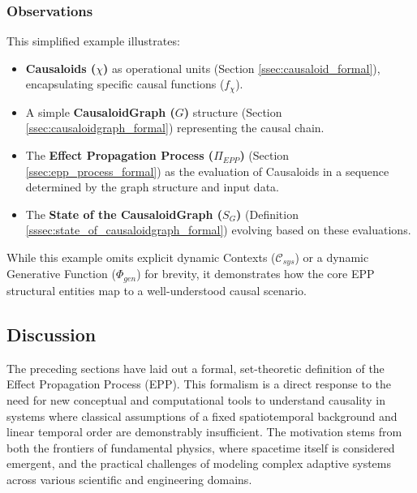     \subsubsection{Observations}
    \label{ssec:example_observations_connection}
    This simplified example illustrates:
    \begin{itemize}
        \item \textbf{Causaloids (\(\chi\))} as operational units (Section \ref{ssec:causaloid_formal}), encapsulating specific causal functions (\(f_\chi\)).
        \item A simple \textbf{CausaloidGraph (\(G\))} structure (Section \ref{ssec:causaloidgraph_formal}) representing the causal chain.
        \item The \textbf{Effect Propagation Process (\(\Pi_{EPP}\))} (Section \ref{ssec:epp_process_formal}) as the evaluation of Causaloids in a sequence determined by the graph structure and input data.
        \item The \textbf{State of the CausaloidGraph (\(S_G\))} (Definition \ref{sssec:state_of_causaloidgraph_formal}) evolving based on these evaluations.
    \end{itemize}
    While this example omits explicit dynamic Contexts (\(\mathcal{C}_{sys}\)) or a dynamic Generative Function (\(\Phi_{gen}\)) for brevity, it demonstrates how the core EPP structural entities map to a well-understood causal scenario.
    
    
\subsection[Discussion]{Discussion} 
\label{sec:formalization_example_discussion}

The preceding sections have laid out a formal, set-theoretic definition of the Effect Propagation Process (EPP). This formalism is a direct response to the need for new conceptual and computational tools to understand causality in systems where classical assumptions of a fixed spatiotemporal background and linear temporal order are demonstrably insufficient. The motivation stems from both the frontiers of fundamental physics, where spacetime itself is considered emergent, and the practical challenges of modeling complex adaptive systems across various scientific and engineering domains.


